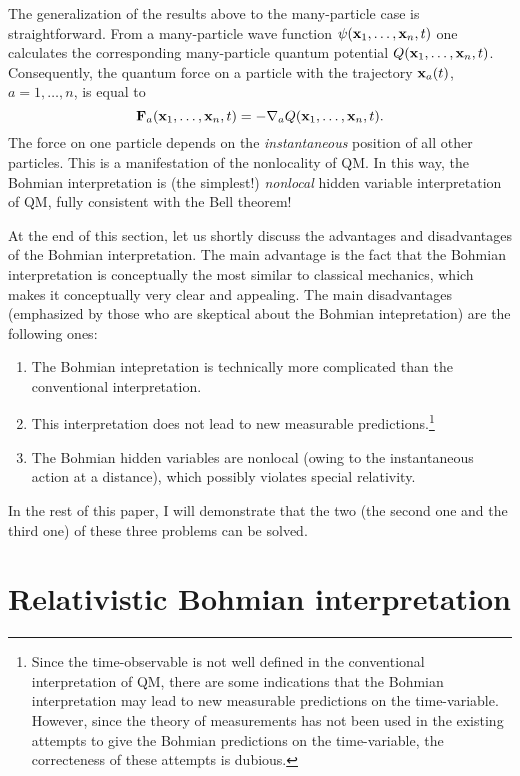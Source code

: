 \documentclass[10pt,twoside]{aipproc} %
\begin{document}
The generalization of the results above 
to the many-particle case is straightforward. 
From a many-particle wave function  
$\psi({\bf x}_1, \ldots, {\bf x}_n,t)$ one calculates
the corresponding many-particle quantum potential 
$Q({\bf x}_1, \ldots, {\bf x}_n,t)$.
Consequently, the quantum force on a particle with the trajectory 
${\bf x}_a(t)$, $a=1,\ldots,n$, is equal to
\begin{equation}
{\bf F}_a({\bf x}_1, \ldots, {\bf x}_n,t)=
-\nabla_a Q({\bf x}_1, \ldots, {\bf x}_n,t) .
\end{equation}
The force on one particle depends on the {\em instantaneous} 
position of all other particles. This is a manifestation
of the nonlocality of QM. In this way, the 
Bohmian interpretation is (the simplest!) {\em nonlocal} 
hidden variable interpretation of QM, fully consistent with the Bell theorem! 

At the end of this section, let us shortly discuss the
advantages and disadvantages of the Bohmian interpretation.
The main advantage is the fact that the Bohmian interpretation 
is conceptually the 
most similar to classical mechanics, which makes it conceptually 
very clear and appealing. 
The main disadvantages (emphasized by those who are skeptical 
about the Bohmian intepretation) are the following ones:
\begin{enumerate}
\item The Bohmian intepretation is 
technically more complicated than the conventional interpretation. 
\item This interpretation does not lead to new measurable 
predictions.\footnote{Since the time-observable 
is not well defined in the conventional 
interpretation of QM, there are some indications 
that the Bohmian interpretation may lead to new measurable
predictions on the time-variable. However, since the theory 
of measurements has not been used in the existing attempts to give the 
Bohmian predictions on the time-variable, 
the correcteness of these attempts is dubious.} 
\item The Bohmian hidden variables are nonlocal 
(owing to the instantaneous action at a distance), 
which possibly violates special relativity.
\end{enumerate}  
In the rest of this paper, I will demonstrate that the two 
(the second one and the third one) 
of these three problems can be solved.
  
\section{Relativistic Bohmian interpretation}
\end{document}

